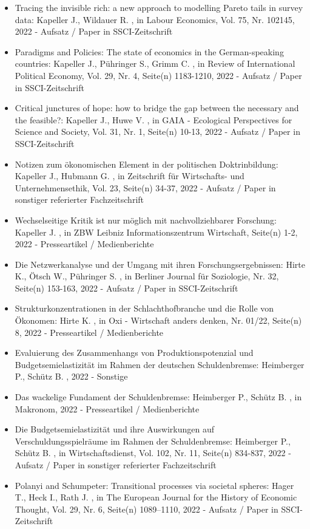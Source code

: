 \begin{itemize}
	 \item Tracing the invisible rich: a new approach to modelling Pareto tails in survey data: Kapeller J., Wildauer R. , in Labour Economics, Vol. 75, Nr. 102145, 2022 - Aufsatz / Paper in SSCI-Zeitschrift
	 \item Paradigms and Policies: The state of economics in the German-speaking countries: Kapeller J., Pühringer S., Grimm C. , in Review of International Political Economy, Vol. 29, Nr. 4, Seite(n) 1183-1210, 2022 - Aufsatz / Paper in SSCI-Zeitschrift
	 \item Critical junctures of hope: how to bridge the gap between the necessary and the feasible?: Kapeller J., Huwe V. , in GAIA - Ecological Perspectives for Science and Society, Vol. 31, Nr. 1, Seite(n) 10-13, 2022 - Aufsatz / Paper in SSCI-Zeitschrift
	 \item Notizen zum ökonomischen Element in der politischen Doktrinbildung: Kapeller J., Hubmann G. , in Zeitschrift für Wirtschafts- und Unternehmensethik, Vol. 23, Seite(n) 34-37, 2022 - Aufsatz / Paper in sonstiger referierter Fachzeitschrift
	 \item Wechselseitige Kritik ist nur möglich mit nachvollziehbarer Forschung: Kapeller J. , in ZBW Leibniz Informationszentrum Wirtschaft, Seite(n) 1-2, 2022 - Presseartikel / Medienberichte
	 \item Die Netzwerkanalyse und der Umgang mit ihren Forschungsergebnissen: Hirte K., Ötsch W., Pühringer S. , in Berliner Journal für Soziologie, Nr. 32, Seite(n) 153-163, 2022 - Aufsatz / Paper in SSCI-Zeitschrift
	 \item Strukturkonzentrationen in der Schlachthofbranche und die Rolle von Ökonomen: Hirte K. , in Oxi - Wirtschaft anders denken, Nr. 01/22, Seite(n) 8, 2022 - Presseartikel / Medienberichte
	 \item Evaluierung des Zusammenhangs von Produktionspotenzial und Budgetsemielastizität im Rahmen der deutschen Schuldenbremse: Heimberger P., Schütz B. , 2022 - Sonstige
	 \item Das wackelige Fundament der Schuldenbremse: Heimberger P., Schütz B. , in Makronom, 2022 - Presseartikel / Medienberichte
	 \item Die Budgetsemielastizität und ihre Auswirkungen auf Verschuldungsspielräume im Rahmen der Schuldenbremse: Heimberger P., Schütz B. , in Wirtschaftsdienst, Vol. 102, Nr. 11, Seite(n) 834-837, 2022 - Aufsatz / Paper in sonstiger referierter Fachzeitschrift
	 \item Polanyi and Schumpeter: Transitional processes via societal spheres: Hager T., Heck I., Rath J. , in The European Journal for the History of Economic Thought, Vol. 29, Nr. 6, Seite(n) 1089–1110, 2022 - Aufsatz / Paper in SSCI-Zeitschrift

\end{itemize}
